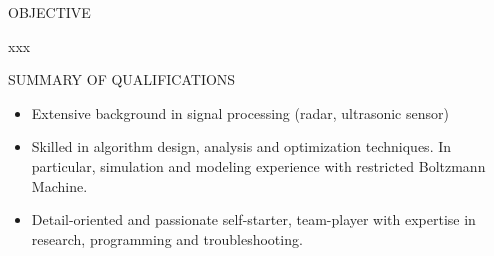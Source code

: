 \documentclass{resume} %
\begin{document}
 
\begin{rSection}{OBJECTIVE} 

xxx

\end{rSection}


 
\begin{rSection}{SUMMARY OF QUALIFICATIONS}  
\begin{itemize}
\item Extensive background in signal processing (radar, ultrasonic sensor)
\item Skilled in algorithm design, analysis and optimization techniques. In particular, simulation and modeling experience with restricted Boltzmann Machine.
\item Detail-oriented and passionate self-starter, team-player with expertise in research, programming and troubleshooting.
\end{itemize}
\end{rSection}

\end{document}
